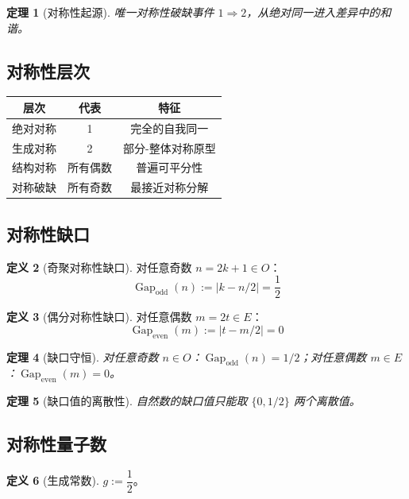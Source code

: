 \documentclass[12pt]{article}
\newtheorem{theorem}{定理}[section]
\theoremstyle{definition}
\newtheorem{definition}[theorem]{定义}
\newcommand{\Gap}{\operatorname{Gap}}
\begin{document}
\begin{theorem}[对称性起源]
唯一对称性破缺事件 \(1 \Rightarrow 2\)，从绝对同一进入差异中的和谐。
\end{theorem}

\subsection{对称性层次}

\begin{center}
\begin{tabular}{|c|c|c|}
\hline
\textbf{层次} & \textbf{代表} & \textbf{特征} \\
\hline
绝对对称 & 1 & 完全的自我同一 \\
生成对称 & 2 & 部分-整体对称原型 \\
结构对称 & 所有偶数 & 普遍可平分性 \\
对称破缺 & 所有奇数 & 最接近对称分解 \\
\hline
\end{tabular}
\end{center}

\subsection{对称性缺口}

\begin{definition}[奇聚对称性缺口]
对任意奇数 \(n = 2k+1 \in O\)：
\[
\Gap_{\text{odd}}(n) := |k - n/2| = \frac{1}{2}
\]
\end{definition}

\begin{definition}[偶分对称性缺口]
对任意偶数 \(m = 2t \in E\)：
\[
\Gap_{\text{even}}(m) := |t - m/2| = 0
\]
\end{definition}

\begin{theorem}[缺口守恒]
对任意奇数 \(n \in O\)：\(\Gap_{\text{odd}}(n) = 1/2\)；对任意偶数 \(m \in E\)：\(\Gap_{\text{even}}(m) = 0\)。
\end{theorem}

\begin{theorem}[缺口值的离散性]
自然数的缺口值只能取 \(\{0, 1/2\}\) 两个离散值。
\end{theorem}

\subsection{对称性量子数}

\begin{definition}[生成常数]
\(g := \dfrac{1}{2}\)。
\end{definition}
\end{document}
